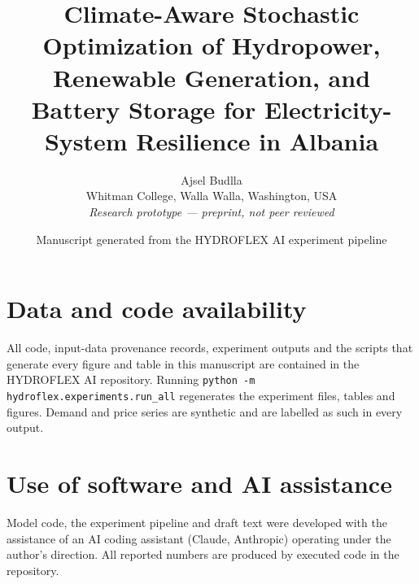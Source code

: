 \documentclass[11pt,a4paper]{article}
\title{\textbf{Climate-Aware Stochastic Optimization of Hydropower, Renewable Generation, and Battery Storage for Electricity-System Resilience in Albania}}
\author{Ajsel Budlla\\[2pt]
\small Whitman College, Walla Walla, Washington, USA\\
\small \textit{Research prototype — preprint, not peer reviewed}}
\date{\small Manuscript generated from the HYDROFLEX AI experiment pipeline}
\begin{document}
\setlength{\emergencystretch}{2.5em}
\maketitle














\section*{Data and code availability}
All code, input-data provenance records, experiment outputs and the scripts that generate every figure and
table in this manuscript are contained in the HYDROFLEX AI repository. Running
\texttt{python -m hydroflex.experiments.run\_all} regenerates the experiment files, tables and figures.
Demand and price series are synthetic and are labelled as such in every output.

\section*{Use of software and AI assistance}
Model code, the experiment pipeline and draft text were developed with the assistance of an AI coding
assistant (Claude, Anthropic) operating under the author's direction. All reported numbers are produced by
executed code in the repository.


{\sloppy
}

\appendix

\end{document}
